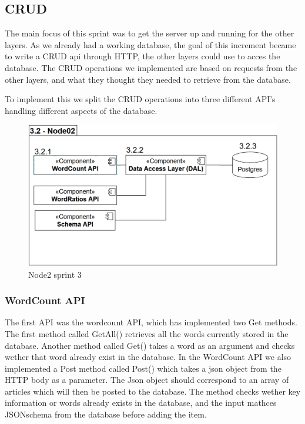 \subsection{CRUD}

The main focus of this sprint was to get the server up and running for the other layers. 
As we already had a working database, the goal of this increment became to write a CRUD api through HTTP, 
the other layers could use to acces the database.
The CRUD operations we implemented are based on requests from the other layers, and what they thought they needed to retrieve from the database.

To implement this we split the CRUD operations into three different API's handling different aspects of the database.

\begin{figure} \centering
   \includegraphics{Images/Node02Sprint3.PNG}
   \caption{Node2 sprint 3}
   \label{Node02Sprint3}
\end{figure}

\subsubsection{WordCount API}
The first API was the wordcount API, which has implemented two Get methods.
The first method called GetAll() retrieves all the words currently stored in the database.
Another method called Get() takes a word as an argument and checks wether that word already exist in the database.
In the WordCount API we also implemented a Post method called Post() which takes a json object from the HTTP body as a parameter. 
The Json object should correspond to an array of articles which will then be posted to the database. 
The method checks wether key information or words already exists in the database, 
and the input mathces JSONschema from the database before adding the item.



